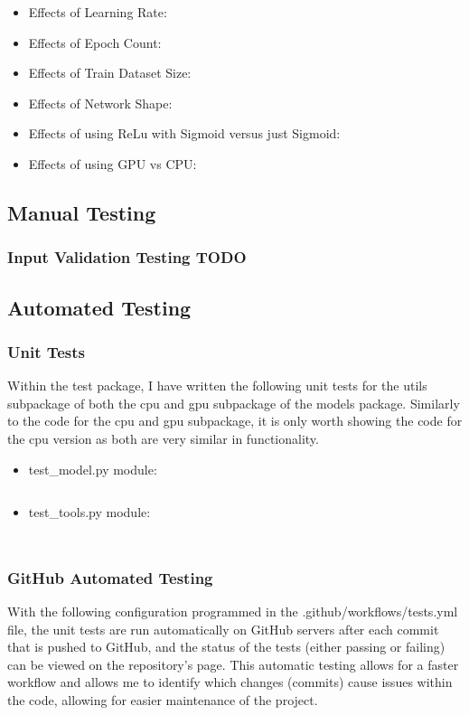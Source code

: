 \documentclass[./project-report/src/latex/project-report.tex]{subfiles}
\begin{document}
\begin{itemize}
    \item Effects of Learning Rate:
    \item Effects of Epoch Count:
    \item Effects of Train Dataset Size:
    \item Effects of Network Shape:
    \item Effects of using ReLu with Sigmoid versus just Sigmoid:
    \item Effects of using GPU vs CPU:
\end{itemize}

\subsection{Manual Testing}

\subsubsection{Input Validation Testing TODO}

\subsection{Automated Testing}

\subsubsection{Unit Tests}

Within the test package, I have written the following unit tests for the utils subpackage of both the cpu and gpu subpackage of the models package. Similarly to the code for the cpu 
and gpu subpackage, it is only worth showing the code for the cpu version as both are very similar in functionality.

\begin{itemize}
    \item test\_model.py module:
        \inputminted{python}{./school_project/test/models/cpu/utils/test_model.py}

        \pagebreak

    \item test\_tools.py module:
        \inputminted{python}{./school_project/test/models/cpu/utils/test_tools.py}
\end{itemize}

\inputminted{python}{./school_project/test/models/cpu.py}

\subsubsection{GitHub Automated Testing}

With the following configuration programmed in the .github/workflows/tests.yml file, the unit tests are run automatically on GitHub servers after each commit that is pushed to GitHub, 
and the status of the tests (either passing or failing) can be viewed on the repository's page. This automatic testing allows for a faster workflow and allows me to identify which changes 
(commits) cause issues within the code, allowing for easier maintenance of the project.

\inputminted{yaml}{./.github/workflows/tests.yml}
\end{document}
